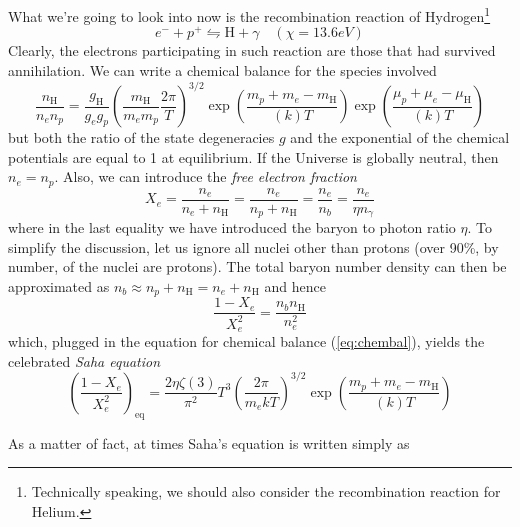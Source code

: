 \par What we're going to look into now is the recombination reaction of Hydrogen\footnote{Technically speaking, we should also consider the recombination reaction for Helium.}
\begin{equation*}
    e^{-} + p^{+} \leftrightharpoons \text{H} + \gamma \quad (\chi = 13.6\unit{eV})
\end{equation*}
Clearly, the electrons participating in such reaction are those that had survived annihilation. We can write a chemical balance for the species involved 
\begin{equation}
    \frac{n_{\text{H}}}{n_{e}n_{p}} = \frac{g_{\text{H}}}{g_{e}g_{p}}\left(\frac{m_{\text{H}}}{m_{e}m_{p}}\frac{2\pi}{T}\right)^{3/2}\exp\left(\frac{m_{p}+m_{e}-m_{\text{H}}}{(k)T}\right)\exp\left(\frac{\mu_{p}+\mu_{e}-\mu_{\text{H}}}{(k)T}\right)
    \label{eq:chembal}
\end{equation}
but both the ratio of the state degeneracies $g$ and the exponential of the chemical potentials are equal to 1 at equilibrium. If the Universe is globally neutral, then $n_{e} = n_{p}$. Also, we can introduce the \emph{free electron fraction}
\begin{equation}
    X_{e}= \frac{n_{e}}{n_{e}+n_{\text{H}}} = \frac{n_{e}}{n_{p}+n_{\text{H}}} = \frac{n_{e}}{n_{b}} = \frac{n_{e}}{\eta n_{\gamma}}
    \label{eq:fef}
\end{equation}
where in the last equality we have introduced the baryon to photon ratio $\eta$. To simplify the discussion, let us ignore all nuclei other than protons (over 90\%, by number, of the nuclei are protons). The total baryon number density can then be approximated as $n_{b} \approx n_{p} + n_{\text{H}} = n_{e} + n_{\text{H}}$ and hence
\begin{equation}
    \frac{1-X_{e}}{X_{e}^{2}} = \frac{n_{b}n_{\text{H}}}{n_{e}^{2}}
\end{equation}
which, plugged in the equation for chemical balance (\ref{eq:chembal}), yields the celebrated \emph{Saha equation}
\begin{equation}
    \boxed{
    \left(\frac{1-X_{e}}{X_{e}^{2}}\right)_{\text{eq}} = \frac{2\eta\zeta(3)}{\pi^{2}}T^{3}\left(\frac{2\pi}{m_{e}kT}\right)^{3/2}\exp\left(\frac{m_{p}+m_{e}-m_{\text{H}}}{(k)T}\right)
    }
    \label{eq:sahaequation}
\end{equation}
\par As a matter of fact, at times Saha's equation is written simply as 
